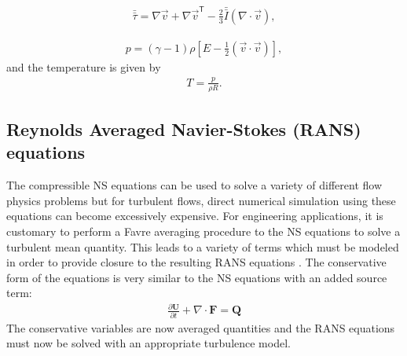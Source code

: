 \begin{align} 
\label{tau}
\bar{\bar{\tau}} = \nabla \vec{v} + {\nabla \vec{v}}^\mathsf{T}  - \frac{2}{3} \bar{\bar{I}} (\nabla \cdot \vec{v} ),
\end{align}

\begin{align} 
\label{constitutive}
p = (\gamma-1) \rho \left [ E - \frac{1}{2} (\vec{v} \cdot \vec{v} ) \right ],
\end{align}
 and the temperature is given by
\begin{align} 
\label{enthalpy}
T = \frac{p}{\rho R}.
\end{align}

\subsection{Reynolds Averaged Navier-Stokes (RANS) equations}
The compressible NS equations can be used to solve a variety of different flow physics problems but for turbulent flows, direct numerical simulation using these equations can become excessively expensive. For engineering applications, it is customary to perform a Favre averaging procedure to the NS equations to solve a turbulent mean quantity. This leads to a variety of terms which must be modeled in order to provide closure to the resulting RANS equations \cite{wilcox1998turbulence,oliver2008high}. The conservative form of the equations is very similar to the NS equations with an added source term:
\begin{align}
	\frac{\partial \boldsymbol{U}}{\partial t} + \nabla \cdot \boldsymbol{F} = \boldsymbol{Q}
\end{align}
The conservative variables are now averaged quantities and the RANS equations must now be solved with an appropriate turbulence model.
